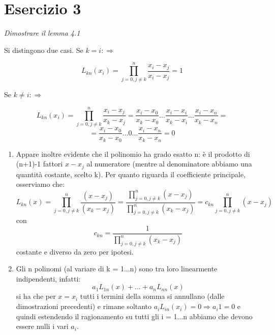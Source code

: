 \section{Esercizio 3}
\label{sub:Esercizio 3}
\emph{Dimostrare il lemma 4.1}
\begin{sol}
	Si distingono due casi. Se $ k=i: \Rightarrow $

		 \[L_{kn}(x_{i})=\prod\limits_{j=0,j\neq{k}}^n {\frac{x_{i}-x_{j}}{x_{i}-x_{j}}} = 1
	 \]

	Se $ k\neq{i}: \Rightarrow $

		 \[L_{kn}(x_{i})=\prod\limits_{j=0,j\neq{k}}^n {\frac{x_{i}-x_{j}}{x_{k}-x_{j}}} = {\frac{x_{i}-x_{0}}{x_{k}-x_{0}}} \text{} ... \text{} {\frac{x_{i}-x_{i}}{x_{k}-x_{i}}} \text{} ... \text{} {\frac{x_{i}-x_{n}}{x_{k}-x_{n}}} =
	 \]
		\[= {\frac{x_{i}-x_{0}}{x_{k}-x_{0}}} \text{} ... \text{} 0 \text{} ... \text{} {\frac{x_{i}-x_{n}}{x_{k}-x_{n}}} = 0
	\]

	\begin{enumerate}
		\item Appare inoltre evidente che il polinomio ha grado esatto n: è il prodotto di (n+1)-1
	fattori $x-x_{j}$ al numeratore (mentre al denominatore abbiamo una quantità costante,
	scelto k). Per quanto riguarda il coefficiente principale, osserviamo che:
		\[
		L_{kn}(x)=\prod\limits_{j=0,j\neq{k}}^n {\frac{(x-x_{j})}{(x_{k}-x_{j})}} = \frac{\prod\limits_{j=0,j\neq{k}}^n {(x-x_{j})}}{\prod\limits_{j=0,j\neq{k}}^n {(x_{k}-x_{j})}} = c_{kn} \text{} \prod\limits_{j=0,j\neq{k}}^n {(x-x_{j})}
	\]
	con
		\[
		c_{kn}=\frac{1}{\prod\limits_{j=0,j\neq{k}}^n {(x_{k}-x_{j})}}
	\]
	costante e diverso da zero per ipotesi.
	\item Gli n polinomi (al variare di k = 1...n) sono tra loro linearmente indipendenti, infatti:
		\[
		a_{1}L_{1n}(x)+ ... +a_{n}L_{nn}(x)
	\]
	si ha che per $x = x_{i}$ tutti i termini della somma si annullano (dalle dimostrazioni precedenti) e rimane soltanto $a_{i}L_{in}(x_{i}) = 0 \Rightarrow a_{i}1 = 0$ e quindi estendendo il ragionamento su tutti gli i = 1...n abbiamo che devono essere nulli i vari $a_{i}$.
	\end{enumerate}
\end{sol}

